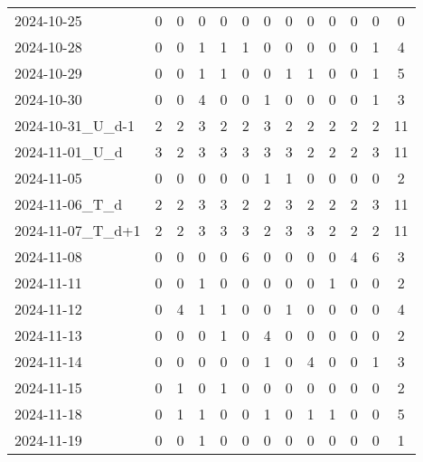 \documentclass[dvipdfmx,oneside]{article}
\begin{document}
\begin{longtable}{lcccccccccccc}
        2024-10-25 &     0 &     0 &     0 &     0 &     0 &     0 &     0 &     0 &     0 &     0 &     0 &      0 \\
        2024-10-28 &     0 &     0 &     1 &     1 &     1 &     0 &     0 &     0 &     0 &     0 &     1 &      4 \\
        2024-10-29 &     0 &     0 &     1 &     1 &     0 &     0 &     1 &     1 &     0 &     0 &     1 &      5 \\
        2024-10-30 &     0 &     0 &     4 &     0 &     0 &     1 &     0 &     0 &     0 &     0 &     1 &      3 \\
2024-10-31\_U\_d-1 &     2 &     2 &     3 &     2 &     2 &     3 &     2 &     2 &     2 &     2 &     2 &     11 \\
  2024-11-01\_U\_d &     3 &     2 &     3 &     3 &     3 &     3 &     3 &     2 &     2 &     2 &     3 &     11 \\
        2024-11-05 &     0 &     0 &     0 &     0 &     0 &     1 &     1 &     0 &     0 &     0 &     0 &      2 \\
  2024-11-06\_T\_d &     2 &     2 &     3 &     3 &     2 &     2 &     3 &     2 &     2 &     2 &     3 &     11 \\
2024-11-07\_T\_d+1 &     2 &     2 &     3 &     3 &     3 &     2 &     3 &     3 &     2 &     2 &     2 &     11 \\
        2024-11-08 &     0 &     0 &     0 &     0 &     6 &     0 &     0 &     0 &     0 &     4 &     6 &      3 \\
        2024-11-11 &     0 &     0 &     1 &     0 &     0 &     0 &     0 &     0 &     1 &     0 &     0 &      2 \\
        2024-11-12 &     0 &     4 &     1 &     1 &     0 &     0 &     1 &     0 &     0 &     0 &     0 &      4 \\
        2024-11-13 &     0 &     0 &     0 &     1 &     0 &     4 &     0 &     0 &     0 &     0 &     0 &      2 \\
        2024-11-14 &     0 &     0 &     0 &     0 &     0 &     1 &     0 &     4 &     0 &     0 &     1 &      3 \\
        2024-11-15 &     0 &     1 &     0 &     1 &     0 &     0 &     0 &     0 &     0 &     0 &     0 &      2 \\
        2024-11-18 &     0 &     1 &     1 &     0 &     0 &     1 &     0 &     1 &     1 &     0 &     0 &      5 \\
        2024-11-19 &     0 &     0 &     1 &     0 &     0 &     0 &     0 &     0 &     0 &     0 &     0 &      1 \\

\end{longtable}
\end{document}
